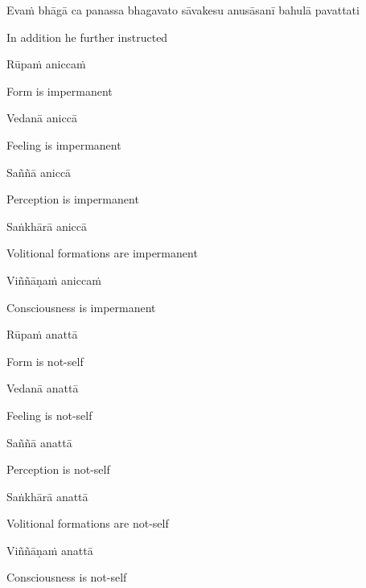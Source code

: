 Evaṁ bhāgā ca panassa bhagavato sāvakesu anusāsanī bahulā pavattati

\begin{cprenglish}
In addition he further instructed
\end{cprenglish}

Rūpaṁ aniccaṁ

\begin{cprenglish}
Form is impermanent
\end{cprenglish}

Vedanā aniccā

\begin{cprenglish}
Feeling is impermanent
\end{cprenglish}

Saññā aniccā

\begin{cprenglish}
Perception is impermanent
\end{cprenglish}

Saṅkhārā aniccā

\begin{cprenglish}
Volitional formations are impermanent
\end{cprenglish}

Viññāṇaṁ aniccaṁ

\begin{cprenglish}
Consciousness is impermanent
\end{cprenglish}

Rūpaṁ anattā

\begin{cprenglish}
Form is not-self
\end{cprenglish}

Vedanā anattā

\begin{cprenglish}
Feeling is not-self
\end{cprenglish}

Saññā anattā

\begin{cprenglish}
Perception is not-self
\end{cprenglish}

Saṅkhārā anattā

\begin{cprenglish}
Volitional formations are not-self
\end{cprenglish}

Viññāṇaṁ anattā

\begin{cprenglish}
Consciousness is not-self
\end{cprenglish}

